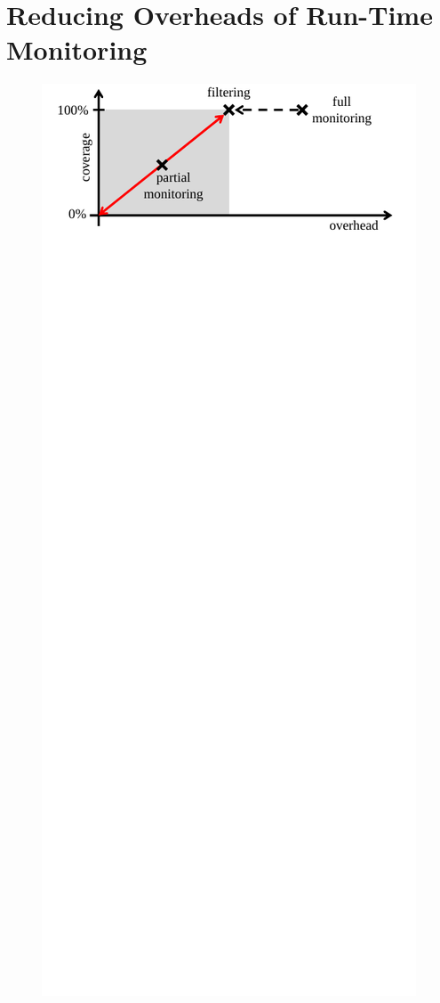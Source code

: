 \section{Reducing Overheads of Run-Time Monitoring}
\label{sec:optimizations}

\begin{figure}
  \begin{center}
    \includegraphics[width=\columnwidth]{figs/optimization_overview.pdf}

\end{center}
\end{figure}
